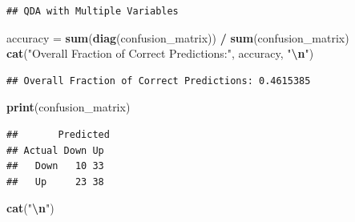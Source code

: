 \documentclass[
]{article}
\newenvironment{Shaded}{\begin{snugshade}}{\end{snugshade}}
\newcommand{\AttributeTok}[1]{\textcolor[rgb]{0.13,0.29,0.53}{#1}}
\newcommand{\CommentTok}[1]{\textcolor[rgb]{0.56,0.35,0.01}{\textit{#1}}}
\newcommand{\DecValTok}[1]{\textcolor[rgb]{0.00,0.00,0.81}{#1}}
\newcommand{\FunctionTok}[1]{\textcolor[rgb]{0.13,0.29,0.53}{\textbf{#1}}}
\newcommand{\NormalTok}[1]{#1}
\newcommand{\OtherTok}[1]{\textcolor[rgb]{0.56,0.35,0.01}{#1}}
\newcommand{\SpecialCharTok}[1]{\textcolor[rgb]{0.81,0.36,0.00}{\textbf{#1}}}
\newcommand{\StringTok}[1]{\textcolor[rgb]{0.31,0.60,0.02}{#1}}
\begin{document}
\begin{verbatim}
## QDA with Multiple Variables
\end{verbatim}

\begin{Shaded}
\begin{Highlighting}[]
\NormalTok{accuracy }\OtherTok{=} \FunctionTok{sum}\NormalTok{(}\FunctionTok{diag}\NormalTok{(confusion\_matrix)) }\SpecialCharTok{/} \FunctionTok{sum}\NormalTok{(confusion\_matrix)}
\FunctionTok{cat}\NormalTok{(}\StringTok{"Overall Fraction of Correct Predictions:"}\NormalTok{, accuracy, }\StringTok{"}\SpecialCharTok{\textbackslash{}n}\StringTok{"}\NormalTok{)}
\end{Highlighting}
\end{Shaded}

\begin{verbatim}
## Overall Fraction of Correct Predictions: 0.4615385
\end{verbatim}

\begin{Shaded}
\begin{Highlighting}[]
\FunctionTok{print}\NormalTok{(confusion\_matrix)}
\end{Highlighting}
\end{Shaded}

\begin{verbatim}
##       Predicted
## Actual Down Up
##   Down   10 33
##   Up     23 38
\end{verbatim}

\begin{Shaded}
\begin{Highlighting}[]
\FunctionTok{cat}\NormalTok{(}\StringTok{"}\SpecialCharTok{\textbackslash{}n}\StringTok{"}\NormalTok{)}
\end{Highlighting}
\end{Shaded}

\begin{Shaded}
\end{Shaded}
\end{document}
